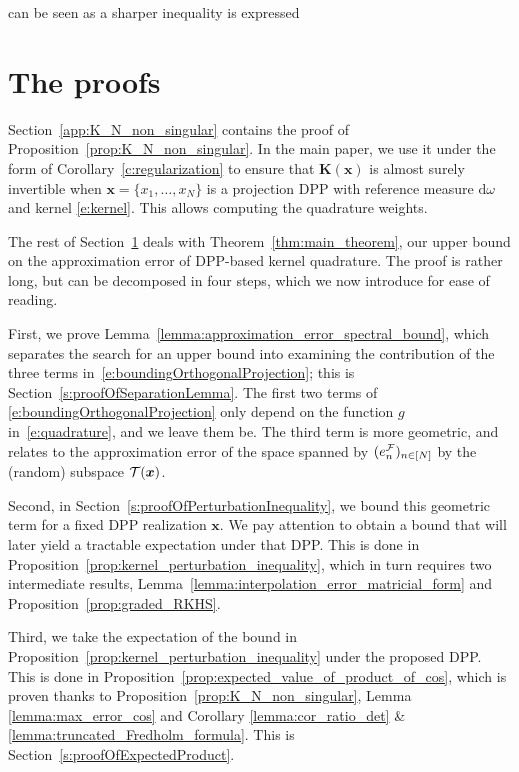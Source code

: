 \documentclass[twoside,11pt]{book}
\numberwithin{theorem}{chapter}
\numberwithin{definition}{chapter}
\numberwithin{proposition}{chapter}
\numberwithin{corollary}{chapter}
\numberwithin{example}{chapter}
\numberwithin{lemma}{chapter}
\numberwithin{assumption}{chapter}
\begin{document}
can be seen as a sharper inequality is expressed 


\label{subsec:dpp_quadrature_error_strong}




\section{The proofs}
\label{s:proofs}
Section~\ref{app:K_N_non_singular} contains the proof of Proposition~\ref{prop:K_N_non_singular}. In the main paper, we use it under the form of Corollary~\ref{c:regularization} to ensure that $\bm{K}(\bm{x})$ is almost surely invertible when $\bm{x} = \{x_{1}, \dots , x_{N}\}$ is a projection DPP with reference measure $\mathrm{d}\omega$ and kernel \eqref{e:kernel}. This allows computing the quadrature weights.

The rest of Section~\ref{s:proofs} deals with Theorem~\ref{thm:main_theorem}, our upper bound on the approximation error of DPP-based kernel quadrature. The proof is rather long, but can be decomposed in four steps, which we now introduce for ease of reading.

First, we prove Lemma~\ref{lemma:approximation_error_spectral_bound}, which separates the search for an upper bound into examining the contribution of the three terms in~\eqref{e:boundingOrthogonalProjection}; this is Section~\ref{s:proofOfSeparationLemma}. The first two terms of \eqref{e:boundingOrthogonalProjection} only depend on the function $g$ in~\eqref{e:quadrature}, and we leave them be. The third term is more geometric, and relates to the approximation error of the space spanned by $(e^{\cal F}_n)_{n\in[N]}$ by the (random) subspace ${\cal T}(\bm{x})$.

Second, in Section~\ref{s:proofOfPerturbationInequality}, we bound this geometric term for a fixed DPP realization $\bm{x}$. We pay attention to obtain a bound that will later yield a tractable expectation under that DPP. This is done in Proposition~\ref{prop:kernel_perturbation_inequality}, which in turn requires two intermediate results, Lemma~\ref{lemma:interpolation_error_matricial_form} and Proposition~\ref{prop:graded_RKHS}.

Third, we take the expectation of the bound in Proposition~\ref{prop:kernel_perturbation_inequality} under the proposed DPP. This is done in Proposition~\ref{prop:expected_value_of_product_of_cos}, which is proven thanks to Proposition~\ref{prop:K_N_non_singular}, Lemma \ref{lemma:max_error_cos} and Corollary \ref{lemma:cor_ratio_det} \& \ref{lemma:truncated_Fredholm_formula}. This is Section~\ref{s:proofOfExpectedProduct}.
\end{document}
